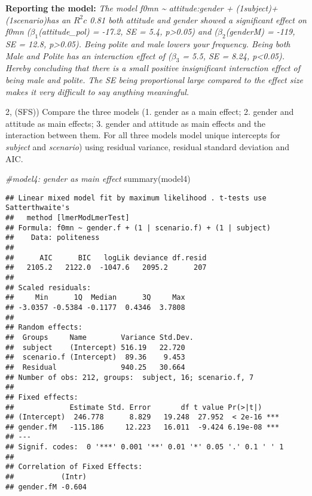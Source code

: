 \documentclass[
]{article}
\newenvironment{Shaded}{\begin{snugshade}}{\end{snugshade}}
\newcommand{\CommentTok}[1]{\textcolor[rgb]{0.56,0.35,0.01}{\textit{#1}}}
\newcommand{\FunctionTok}[1]{\textcolor[rgb]{0.00,0.00,0.00}{#1}}
\newcommand{\NormalTok}[1]{#1}
\begin{document}
\textbf{Reporting the model:} \emph{The model f0mn \textasciitilde{}
attitude:gender + (1\textbar subject)+ (1\textbar scenario)has an
\(R^2c\) 0.81 both attitude and gender showed a significant effect on
f0mn (\(\beta_1\)(attitude\_pol) = -17.2, SE = 5.4, p\textgreater0.05)
and (\(\beta_2\)(genderM) = -119, SE = 12.8, p\textgreater0.05). Being
polite and male lowers your frequency. Being both Male and Polite has an
interaction effect of (\(\beta_3\) = 5.5, SE = 8.24, p\textless0.05).
Hereby concluding that there is a small positive insignificant
interaction effect of being male and polite. The SE being proportional
large compared to the effect size makes it very difficult to say
anything meaningful.}

2, (SFS)) Compare the three models (1. gender as a main effect; 2.
gender and attitude as main effects; 3. gender and attitude as main
effects and the interaction between them. For all three models model
unique intercepts for \emph{subject} and \emph{scenario}) using residual
variance, residual standard deviation and AIC.

\begin{Shaded}
\begin{Highlighting}[]
\CommentTok{\#model4: gender as main effect }
\FunctionTok{summary}\NormalTok{(model4)}
\end{Highlighting}
\end{Shaded}

\begin{verbatim}
## Linear mixed model fit by maximum likelihood . t-tests use Satterthwaite's
##   method [lmerModLmerTest]
## Formula: f0mn ~ gender.f + (1 | scenario.f) + (1 | subject)
##    Data: politeness
## 
##      AIC      BIC   logLik deviance df.resid 
##   2105.2   2122.0  -1047.6   2095.2      207 
## 
## Scaled residuals: 
##     Min      1Q  Median      3Q     Max 
## -3.0357 -0.5384 -0.1177  0.4346  3.7808 
## 
## Random effects:
##  Groups     Name        Variance Std.Dev.
##  subject    (Intercept) 516.19   22.720  
##  scenario.f (Intercept)  89.36    9.453  
##  Residual               940.25   30.664  
## Number of obs: 212, groups:  subject, 16; scenario.f, 7
## 
## Fixed effects:
##             Estimate Std. Error       df t value Pr(>|t|)    
## (Intercept)  246.778      8.829   19.248  27.952  < 2e-16 ***
## gender.fM   -115.186     12.223   16.011  -9.424 6.19e-08 ***
## ---
## Signif. codes:  0 '***' 0.001 '**' 0.01 '*' 0.05 '.' 0.1 ' ' 1
## 
## Correlation of Fixed Effects:
##           (Intr)
## gender.fM -0.604
\end{verbatim}
\end{document}
